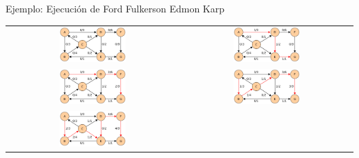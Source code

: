\documentclass{beamer}
\begin{document}
\begin{frame}{Ejemplo: Ejecución de Ford Fulkerson Edmon Karp}
    \begin{tabular}{c c}
        \includegraphics[width=0.4\textwidth]{imgs/edmon-karp/frame-1.png} &
        \pause 
        \includegraphics[width=0.4\textwidth]{imgs/edmon-karp/frame-2.png} \\
        \pause
        \includegraphics[width=0.4\textwidth]{imgs/edmon-karp/frame-3.png} &
        \pause
        \includegraphics[width=0.4\textwidth]{imgs/edmon-karp/frame-4.png} \\
        \pause
        \includegraphics[width=0.4\textwidth]{imgs/edmon-karp/frame-5.png} & 
    \end{tabular}
\end{frame}
\end{document}
